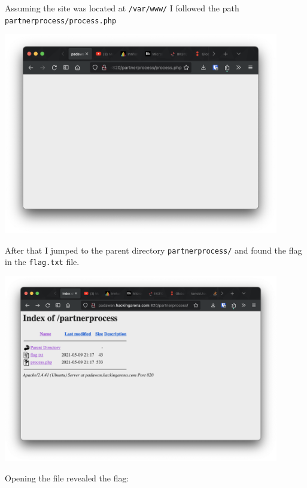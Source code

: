 Assuming the site was located at \texttt{/var/www/} I followed the path \texttt{partnerprocess/process.php}

\begin{center}
    \includegraphics[width=12cm]{img/Web hacking/Web 5/Skjermbilde 2023-10-26 kl. 13.38.18.png}
\end{center}

After that I jumped to the parent directory \texttt{partnerprocess/} and found the flag in the \texttt{flag.txt} file.

\begin{center}
    \includegraphics[width=12cm]{img/Web hacking/Web 5/Skjermbilde 2023-10-26 kl. 13.37.19.png}
\end{center}

Opening the file revealed the flag:

